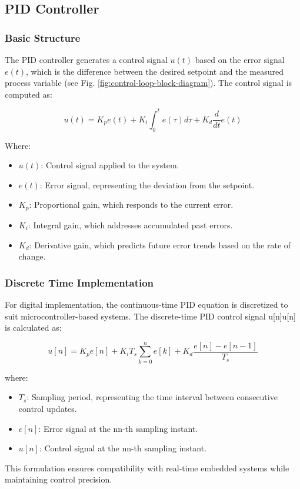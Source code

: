 \subsection{PID Controller}\label{section:pid_controller}
\subsubsection{Basic Structure}
The PID controller generates a control signal $u(t)$ based on the error signal $e(t)$, which is the difference between the desired setpoint and the measured process variable (see Fig. \ref{fig:control-loop-block-diagram}). The control signal is computed as:

\begin{equation}
	u(t) = K_p e(t) + K_i \int_0^t e(\tau)d\tau + K_d \frac{d}{dt}e(t)
\end{equation}

Where:
\begin{itemize}
	\item $u(t)$: Control signal applied to the system.
	\item $e(t)$: Error signal, representing the deviation from the setpoint.
	\item $K_p$: Proportional gain, which responds to the current error.
	\item $K_i$: Integral gain, which addresses accumulated past errors.
	\item $K_d$: Derivative gain, which predicts future error trends based on the rate of change.
\end{itemize}

\subsubsection{Discrete Time Implementation}
For digital implementation, the continuous-time PID equation is discretized to suit microcontroller-based systems. The discrete-time PID control signal u[n]u[n] is calculated as:

\begin{equation}
	u[n] = K_p e[n] + K_i T_s \sum_{k=0}^n e[k] + K_d \frac{e[n] - e[n-1]}{T_s}
\end{equation}

where:
\begin{itemize}
	\item $T_s$: Sampling period, representing the time interval between consecutive control updates.
	\item $e[n]$: Error signal at the nn-th sampling instant.
	\item $u[n]$: Control signal at the nn-th sampling instant.
\end{itemize}
This formulation ensures compatibility with real-time embedded systems while maintaining control precision.


